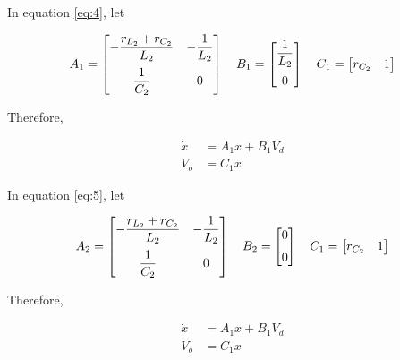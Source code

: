 \documentclass[a4paper]{IEEEtran}
\begin{document}
	In equation \eqref{eq:4}, let

	\begin{equation}
		A_1=
		\begin{bmatrix}
			-\dfrac{r_{L_2}+r_{C_2}}{L_2} & -\dfrac{1}{L_2}\vspace*{2mm}\\
			\dfrac{1}{C_2} & 0
		\end{bmatrix}
		\quad
		B_1=
		\begin{bmatrix}
			\dfrac{1}{L_2} \vspace*{2mm}\\ 0
		\end{bmatrix}
		\quad
		C_1 =
		\begin{bmatrix}
			r_{C_2} & 1
		\end{bmatrix}
		\label{eq:mod10}
	\end{equation}

	Therefore,
	
	\begin{equation}
		\begin{split}
			\dot{x} &= A_1 x + B_1 V_d\\
			V_o &= C_1 x
		\end{split}
		\label{eq:mod11}
	\end{equation}

	In equation \eqref{eq:5}, let

	\begin{equation}
		A_2=
		\begin{bmatrix}
			-\dfrac{r_{L_2}+r_{C_2}}{L_2} & -\dfrac{1}{L_2}\vspace*{2mm}\\
			\dfrac{1}{C_2} & 0
		\end{bmatrix}
		\quad
		B_2=
		\begin{bmatrix}
			0 \vspace*{2mm}\\ 0
		\end{bmatrix}
		\quad
		C_1 =
		\begin{bmatrix}
			r_{C_2} & 1
		\end{bmatrix}
		\label{eq:mod12}
	\end{equation}

	Therefore,

	\begin{equation}
		\begin{split}
			\dot{x} &= A_1 x + B_1 V_d\\
			V_o &= C_1 x
		\end{split}
		\label{eq:mod13}
	\end{equation}
\end{document}
